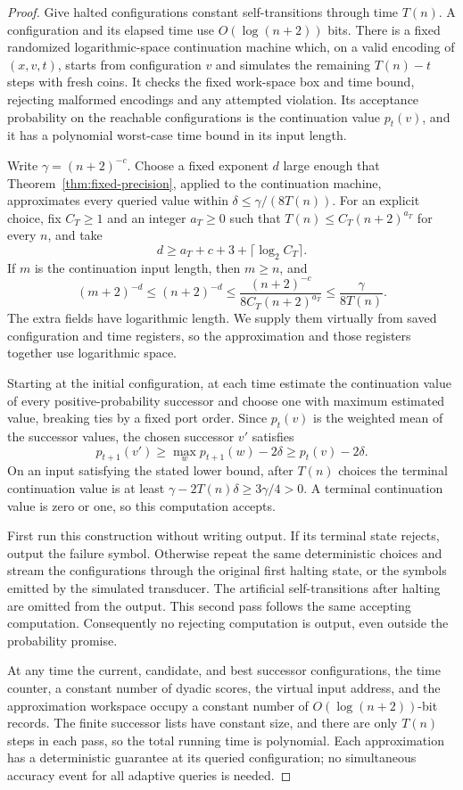 \begin{proof}
Give halted configurations constant self-transitions through time
$T(n)$. A configuration and its elapsed time use $O(\log(n+2))$
bits. There is a fixed randomized logarithmic-space continuation
machine which, on a valid encoding of $(x,v,t)$, starts from
configuration $v$ and simulates the remaining $T(n)-t$ steps with
fresh coins. It checks the fixed work-space box and time bound,
rejecting malformed encodings and any attempted violation. Its
acceptance probability on the reachable configurations is the
continuation value $p_t(v)$, and it has a
polynomial worst-case time bound in its input length.

Write $\gamma=(n+2)^{-c}$. Choose a fixed exponent $d$ large enough
that Theorem~\ref{thm:fixed-precision}, applied to the continuation
machine, approximates every queried value within
$\delta\le\gamma/(8T(n))$. For an explicit choice, fix $C_T\ge1$ and an integer $a_T\ge0$
such that $T(n)\le C_T(n+2)^{a_T}$ for every $n$, and take
\[
 d\ge a_T+c+3+\lceil\log_2 C_T\rceil.
\]
If $m$ is the continuation input length, then $m\ge n$, and
\[
 (m+2)^{-d}\le(n+2)^{-d}
 \le\frac{(n+2)^{-c}}{8C_T(n+2)^{a_T}}
 \le\frac\gamma{8T(n)}.
\]
The extra fields have logarithmic length. We supply them virtually
from saved configuration and time registers, so the approximation
and those registers together use logarithmic space.

Starting at the initial configuration, at each time estimate the
continuation value of every positive-probability successor and
choose one with maximum estimated value, breaking ties by a fixed
port order. Since $p_t(v)$ is the weighted mean of the successor
values, the chosen successor $v'$ satisfies
\[
 p_{t+1}(v')\ge\max_w p_{t+1}(w)-2\delta
                  \ge p_t(v)-2\delta.
\]
On an input satisfying the stated lower bound, after $T(n)$ choices
the terminal continuation value is at least
$\gamma-2T(n)\delta\ge3\gamma/4>0$. A terminal continuation value
is zero or one, so this computation accepts.

First run this construction without writing output. If its terminal
state rejects, output the failure symbol. Otherwise repeat the same
deterministic choices and stream the configurations through the original
first halting state, or the symbols emitted by the simulated transducer.
The artificial self-transitions after halting are omitted from the output.
This second pass follows the same accepting computation. Consequently no rejecting computation
is output, even outside the probability promise.

At any time the current, candidate, and best successor configurations,
the time counter, a constant number of dyadic scores, the virtual
input address, and the approximation workspace occupy a constant
number of $O(\log(n+2))$-bit records. The finite successor lists
have constant size, and there are only $T(n)$ steps in each pass,
so the total running time is polynomial. Each approximation has a
deterministic guarantee at its queried configuration; no simultaneous
accuracy event for all adaptive queries is needed.
\end{proof}
